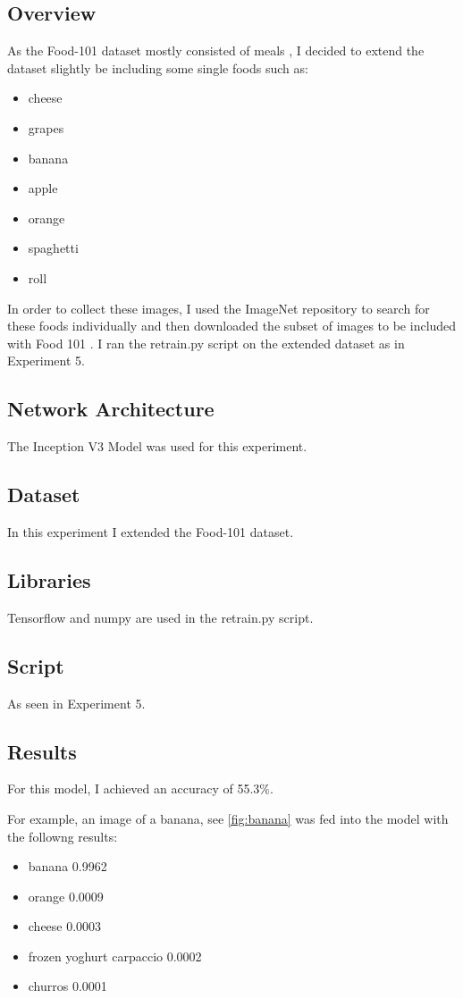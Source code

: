 \subsection*{Overview}
As the Food-101 dataset mostly consisted of meals \textcite{food101}, I decided to extend the
dataset slightly be including some single foods such as:
\begin{itemize}
    \item{cheese}
    \item{grapes}
    \item{banana}
    \item{apple}
    \item{orange}
    \item{spaghetti}
    \item{roll}
\end{itemize}

In order to collect these images, I used the ImageNet repository to search for
these foods individually and then downloaded the subset of images to be included
with Food 101 \textcite{imagenet}. I ran the retrain.py script on the extended dataset as in
Experiment 5.

\subsection*{Network Architecture}
The Inception V3 Model was used for this experiment.

\subsection*{Dataset}
In this experiment I extended the Food-101 dataset.

\subsection*{Libraries}
Tensorflow and numpy are used in the retrain.py script.

\subsection*{Script}
As seen in Experiment 5.

\subsection*{Results}
For this model, I achieved an accuracy of 55.3\%.

For example, an image of a banana, see \ref{fig:banana} was fed into the model with
the followng results:
\begin{itemize}
    \item{banana 0.9962}
    \item{orange 0.0009}
    \item{cheese 0.0003}
    \item{frozen yoghurt carpaccio 0.0002}
    \item{churros 0.0001}
\end{itemize}
 
